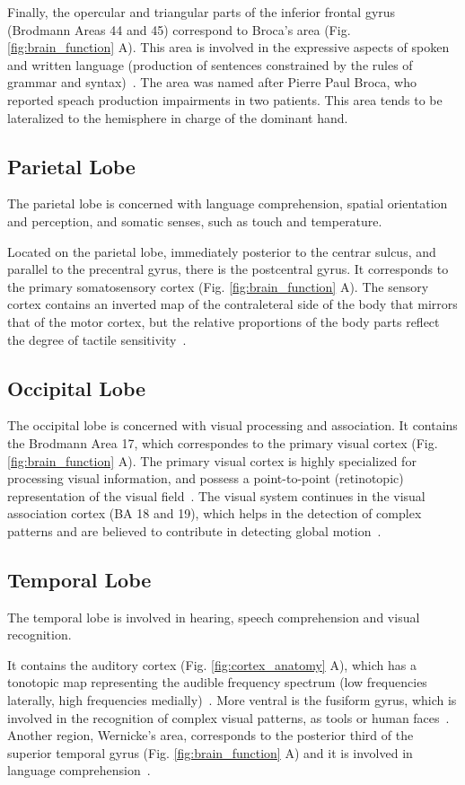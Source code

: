 Finally, the opercular and triangular parts of the inferior frontal gyrus
(Brodmann Areas 44 and 45) correspond to Broca's area (Fig. \ref{fig:brain_function} A). This area is involved in
the expressive aspects of spoken and written language (production of sentences
constrained by the rules of grammar and syntax)~\cite{Johns}. The area was named
after Pierre Paul Broca, who reported speach production impairments in two patients.
This area tends to be lateralized to the hemisphere in charge of the dominant
hand. 

\subsection{Parietal Lobe}
The parietal lobe is concerned with language comprehension, spatial orientation
and perception, and somatic senses, such as touch and temperature.

Located on the parietal lobe, immediately posterior to the centrar sulcus, and
parallel to the precentral gyrus, there is the postcentral gyrus. It corresponds 
to the primary somatosensory cortex  (Fig. \ref{fig:brain_function} A). The sensory cortex contains
an inverted map of the contraleteral side of the body that mirrors that of the motor
cortex, but the relative proportions of the body parts reflect the degree of 
tactile sensitivity~\cite{Johns}.

\subsection{Occipital Lobe}
The occipital lobe is concerned with visual processing and association.
It contains the Brodmann Area 17, which correspondes to the primary visual cortex (Fig. \ref{fig:brain_function} A).
The primary visual cortex is highly specialized for processing visual information, and
possess a point-to-point (retinotopic) representation of the visual field~\cite{Johns}.
The visual system continues in the visual association cortex (BA 18 and 19),
which helps in the detection of complex patterns and are believed to contribute
in detecting global motion~\cite{Johns, Purves2004}.

\subsection{Temporal Lobe}
The temporal lobe is involved in hearing, speech comprehension and visual recognition.

It contains the auditory cortex (Fig. \ref{fig:cortex_anatomy} A), which 
has a tonotopic map representing the audible frequency spectrum (low frequencies
laterally, high frequencies medially)~\cite{Johns}. More ventral is the fusiform
gyrus, which is involved in the recognition of complex visual patterns, as tools
or human faces~\cite{Saygin2011}. Another region, Wernicke's area, corresponds to the 
posterior third of the superior temporal gyrus (Fig. \ref{fig:brain_function} A) and
it is involved in language comprehension~\cite{Johns}. 

